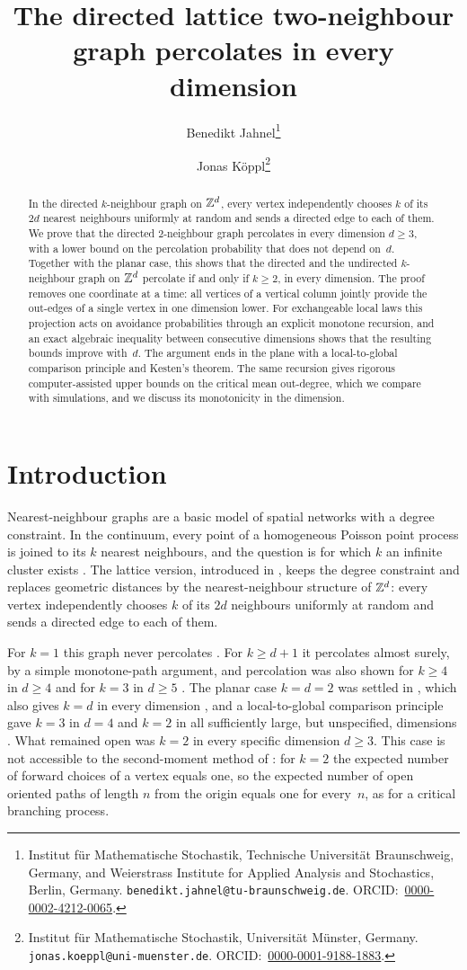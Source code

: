 \documentclass[11pt,letterpaper]{article}
\title{The directed lattice two-neighbour graph percolates in every dimension}
\author{Benedikt Jahnel\thanks{Institut f\"ur Mathematische Stochastik, Technische Universit\"at Braunschweig, Germany, and Weierstrass Institute for Applied Analysis and Stochastics, Berlin, Germany. \texttt{benedikt.jahnel@tu-braunschweig.de}. ORCID:~\mbox{\href{https://orcid.org/0000-0002-4212-0065}{0000-0002-4212-0065}}.} \and Jonas K\"oppl\thanks{Institut f\"ur Mathematische Stochastik, Universit\"at M\"unster, Germany. \texttt{jonas.koeppl@uni-muenster.de}. ORCID:~\mbox{\href{https://orcid.org/0000-0001-9188-1883}{0000-0001-9188-1883}}.}}
\date{}
\begin{document}
\maketitle
\thispagestyle{plain}

\begin{abstract}
In the directed $k$-neighbour graph on $\mathbb Z^d$, every vertex independently chooses $k$ of its $2d$ nearest neighbours uniformly at random and sends a directed edge to each of them. We prove that the directed $2$-neighbour graph percolates in every dimension $d\ge3$, with a lower bound on the percolation probability that does not depend on~$d$. Together with the planar case, this shows that the directed and the undirected $k$-neighbour graph on $\mathbb Z^d$ percolate if and only if $k\ge2$, in every dimension. The proof removes one coordinate at a time: all vertices of a vertical column jointly provide the out-edges of a single vertex in one dimension lower. For exchangeable local laws this projection acts on avoidance probabilities through an explicit monotone recursion, and an exact algebraic inequality between consecutive dimensions shows that the resulting bounds improve with~$d$. The argument ends in the plane with a local-to-global comparison principle and Kesten's theorem. The same recursion gives rigorous computer-assisted upper bounds on the critical mean out-degree, which we compare with simulations, and we discuss its monotonicity in the dimension.
\end{abstract}

\section{Introduction}\label{sec:intro}

Nearest-neighbour graphs are a basic model of spatial networks with a degree constraint. In the continuum, every point of a homogeneous Poisson point process is joined to its $k$ nearest neighbours, and the question is for which $k$ an infinite cluster exists \cite{HM96,BB13}. The lattice version, introduced in \cite{JKLT25}, keeps the degree constraint and replaces geometric distances by the nearest-neighbour structure of $\mathbb Z^d$: every vertex independently chooses $k$ of its $2d$ neighbours uniformly at random and sends a directed edge to each of them.

For $k=1$ this graph never percolates \cite{JKLT25}. For $k\ge d+1$ it percolates almost surely, by a simple monotone-path argument, and percolation was also shown for $k\ge4$ in $d\ge4$ and for $k=3$ in $d\ge5$ \cite{JKLT25}. The planar case $k=d=2$ was settled in \cite{CHJK26}, which also gives $k=d$ in every dimension \cite[Corollary~2.4]{CHJK26}, and a local-to-global comparison principle gave $k=3$ in $d=4$ and $k=2$ in all sufficiently large, but unspecified, dimensions \cite{BJKLRT25}. What remained open was $k=2$ in every specific dimension $d\ge3$. This case is not accessible to the second-moment method of \cite{CD83,JKLT25}: for $k=2$ the expected number of forward choices of a vertex equals one, so the expected number of open oriented paths of length $n$ from the origin equals one for every~$n$, as for a critical branching process.
\end{document}
